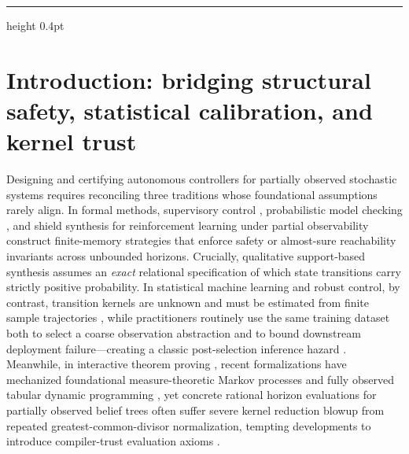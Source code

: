 \documentclass[11pt,a4paper]{article}
\begin{document}
\vspace{3pt}
\par
\vspace{3pt}
\par
\vspace{8pt}
\hrule height 0.4pt
\vspace{10pt}

\section{Introduction: bridging structural safety, statistical
calibration, and kernel
trust}\label{introduction-bridging-structural-safety-statistical-calibration-and-kernel-trust}

Designing and certifying autonomous controllers for partially observed
stochastic systems requires reconciling three traditions whose
foundational assumptions rarely align. In formal methods, supervisory
control \citep{ramadgeWonham1987, tabuada2009, cassandrasLafortune2021},
probabilistic model checking
\citep{baierKatoen2008, kwiatkowska2011, dehnert2017}, and shield
synthesis for reinforcement learning under partial observability
\citep{chatterjee2016, alshiekh2018, junges2021, carr2023} construct
finite-memory strategies that enforce safety or almost-sure reachability
invariants across unbounded horizons. Crucially, qualitative
support-based synthesis assumes an \emph{exact} relational specification
of which state transitions carry strictly positive probability. In
statistical machine learning and robust control, by contrast, transition
kernels are unknown and must be estimated from finite sample
trajectories
\citep{kearnsSingh2002, strehl2009, nilimElGhaoui2005, wiesemann2013},
while practitioners routinely use the same training dataset both to
select a coarse observation abstraction
\citep{ravindranBarto2004, ferns2004} and to bound downstream deployment
failure---creating a classic post-selection inference hazard
\citep{berk2013, mayo2018}. Meanwhile, in interactive theorem proving
\citep{nipkowPaulsonWenzel2002, bertotCasteran2004, mouraUllrich2021},
recent formalizations have mechanized foundational measure-theoretic
Markov processes and fully observed tabular dynamic programming
\citep{hoelzl2017, vajjha2021, schaeffelerAbdulaziz2023}, yet concrete
rational horizon evaluations for partially observed belief trees often
suffer severe kernel reduction blowup from repeated
greatest-common-divisor normalization, tempting developments to
introduce compiler-trust evaluation axioms \citep{boespflug2011}.
\end{document}

